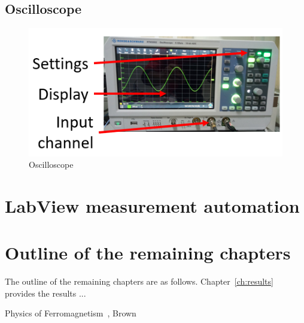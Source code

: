 \subsection{Oscilloscope}
\begin{figure}[H]
	\centering
		
		\includegraphics{17.png}
		\caption{Oscilloscope }
\end{figure}
\section{LabView measurement automation}


\section{\label{sec:outline}Outline of the remaining chapters}

The outline of the remaining chapters are as follows. Chapter~\ref{ch:results} provides the results ... 

Physics of Ferromagnetism~\cite{chika97}, Brown~\cite{brown68}